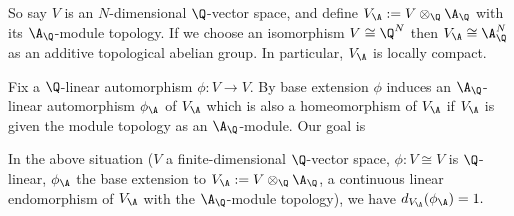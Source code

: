   So say $V$ is an $N$-dimensional $\Q$-vector space,
  and define $V_{\A}:= V\otimes_{\Q}\A_{\Q}$ with its $\A_{\Q}$-module topology.
  If we choose an isomorphism $V\cong\Q^N$ then $V_{\A}\cong\A_{\Q}^N$
  as an additive topological abelian group. In particular, $V_{\A}$ is locally compact.

  Fix a $\Q$-linear automorphism $\phi:V\to V$. By base extension $\phi$ induces
  an $\A_{\Q}$-linear automorphism $\phi_{\A}$ of $V_{\A}$ which is also a homeomorphism of $V_{\A}$
  if $V_{\A}$ is given the module topology as an $\A_{\Q}$-module. Our goal is

  \begin{theorem}
    \label{MeasureTheory.addHaarScalarFactor_tensor_adeles_eq_one}
    \leanok
    In the above situation ($V$ a finite-dimensional $\Q$-vector space, $\phi:V\cong V$ is
    $\Q$-linear, $\phi_{\A}$ the base extension to $V_{\A}:=V\otimes_{\Q}{\A_{\Q}}$, a continuous linear
    endomorphism of $V_{\A}$ with the $\A_{\Q}$-module topology), we have $d_{V_{\A}}(\phi_{\A})=1.$
  \end{theorem}
